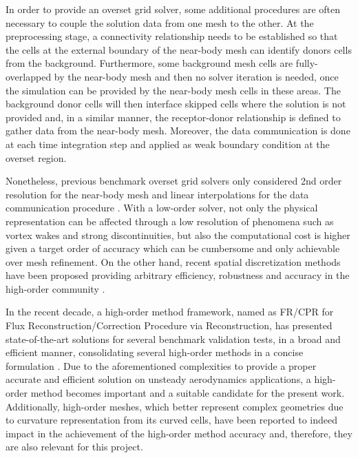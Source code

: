 In order to provide an overset grid solver, some additional procedures are often necessary to couple the solution data from one mesh to the other. At the preprocessing stage, a connectivity relationship needs to be established so that the cells at the external boundary of the near-body mesh can identify donors cells from the background. Furthermore, some background mesh cells are fully-overlapped by the near-body mesh and then no solver iteration is needed, once the simulation can be provided by the near-body mesh cells in these areas. The background donor cells will then interface skipped cells where the solution is not provided and, in a similar manner, the receptor-donor relationship is defined to gather data from the near-body mesh. Moreover, the data communication is done at each time integration step and applied as weak boundary condition at the overset region. 

Nonetheless, previous benchmark overset grid solvers only considered 2nd order resolution for the near-body mesh and linear interpolations for the data communication procedure \cite{Suhs2003, Sankaran2011}. With a low-order solver, not only the physical representation can be affected through a low resolution of phenomena such as vortex wakes and strong discontinuities, but also the computational cost is higher given a target order of accuracy which can be cumbersome and only achievable over mesh refinement. On the other hand, recent spatial discretization methods have been proposed providing arbitrary efficiency, robustness and accuracy in the high-order community \cite{SD_I:06, SD_II:07, SD_May:06, KrisVanDenAbeele2009, Moreira2016}. 

In the recent decade, a high-order method framework, named as FR/CPR for Flux Reconstruction/Correction Procedure via Reconstruction, has presented state-of-the-art solutions for several benchmark validation tests, in a broad and efficient manner, consolidating several high-order methods in a concise formulation \cite{Gao2013}. Due to the aforementioned complexities to provide a proper accurate and efficient solution on unsteady aerodynamics applications, a high-order method becomes important and a suitable candidate for the present work. Additionally, high-order meshes, which better represent complex geometries due to curvature representation from its curved cells, have been reported to indeed impact in the achievement of the high-order method accuracy \cite{Andre2018} and, therefore, they are also relevant for this project.

